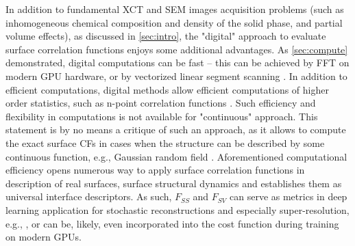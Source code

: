 \documentclass[reprint,amsmath,amssymb,aps,pre,showkeys,showpacs]{revtex4-1}
\begin{document}
In addition to fundamental XCT and SEM images acquisition problems (such as
inhomogeneous chemical composition and density of the solid phase, and partial volume
effects), as discussed in \cref{sec:intro}, the "digital" approach to evaluate
surface correlation functions enjoys some additional advantages. As
\cref{sec:compute} demonstrated, digital computations can be fast -- this can be
achieved by FFT on modern GPU hardware, or by vectorized linear segment scanning
\cite{EPL1}. In addition to efficient computations, digital methods allow
efficient computations of higher order statistics, such as n-point correlation
functions \cite{malmir2018}. Such efficiency and flexibility in computations is
not available for "continuous" approach. This statement is by no means a
critique of such an approach, as it allows to compute the exact surface CFs in
cases when the structure can be described by some continuous function, e.g.,
Gaussian random field \cite{ma2018SS}. Aforementioned computational efficiency
opens numerous way to apply surface correlation  functions in description of
real surfaces, surface structural dynamics and establishes them as universal
interface descriptors. As such, $F_{SS}$ and $F_{SV}$ can serve as metrics in
deep learning application for stochastic reconstructions and especially
super-resolution, e.g., \cite{chen2020super,janssens2020,karimpouli2022}, or can
be, likely, even incorporated into the cost function during training on modern
GPUs.
\end{document}
